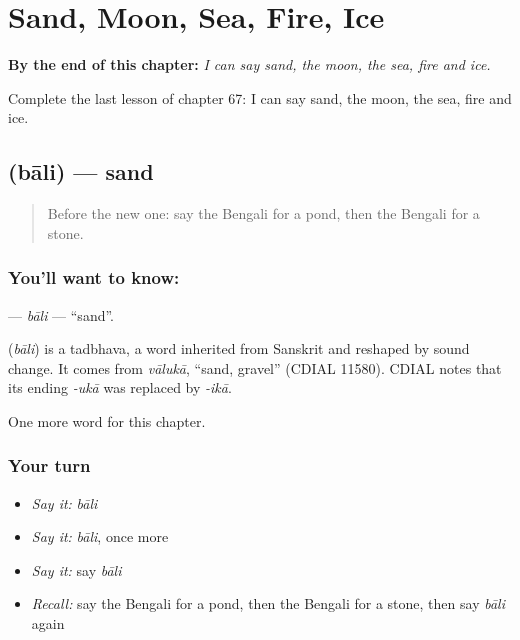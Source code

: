 
\chapter{Sand, Moon, Sea, Fire, Ice}
\label{ch:bn-sand-moon-sea-fire-ice}

\begin{chapteropening}
\textbf{By the end of this chapter:} \emph{I can say sand, the moon, the sea, fire and ice.}

Complete the last lesson of chapter 67: I can say sand, the moon, the sea, fire and ice.
\end{chapteropening}

\section[\texorpdfstring{\bn{বালি} (bāli)}{বালি (bāli)}]{ (bāli) — sand}

\label{lesson:BN-C67-bali}



\begin{quote}
Before the new one: say the Bengali for a pond, then the Bengali for a stone.
\end{quote}

\subsection*{You'll want to know: }
\textbf{} — \emph{bāli} — \textquotedblleft{}sand\textquotedblright{}.

\begin{cousinweb}
\textbf{} (\emph{bāli}) is a tadbhava, a word inherited from Sanskrit and reshaped by sound change. It comes from \emph{vālukā}, \textquotedblleft{}sand, gravel\textquotedblright{} (CDIAL 11580). CDIAL notes that its ending \emph{-ukā} was replaced by \emph{-ikā}.
\end{cousinweb}

\begin{grammarlens}[title={What you've built}]
One more word for this chapter.
\end{grammarlens}

\subsection*{Your turn}
\begin{itemize}
\raggedright
  \item \emph{Say it:} \emph{bāli}
  \item \emph{Say it:} \emph{bāli}, once more
  \item \emph{Say it:} say \emph{bāli}
  \item \emph{Recall:} say the Bengali for a pond, then the Bengali for a stone, then say \emph{bāli} again
\end{itemize}

